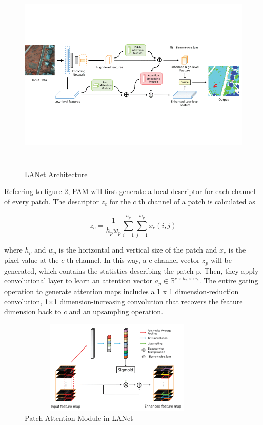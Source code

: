 \FloatBarrier
\begin{figure}[ht]
\includegraphics[width=12.5cm, height=9.5cm]{images/lanet.png}
\centering
\caption{LANet Architecture}
\label{fig:lanet}
\end{figure}

\FloatBarrier

Referring to figure \ref{fig:pam}, PAM will first generate a local descriptor for each channel of every patch. The descriptor $z_c$ for the $c$ th channel of a patch is calculated as

\begin{equation}
    z_c = \frac{1}{h_p w_p} \sum_{i=1}^{h_p} \sum_{j=1}^{w_p} x_c(i,j)
\end{equation}

where $h_p$ and $w_p$ is the horizontal and vertical size of the patch and $x_c$ is the pixel value at the $c$ th channel. In this way, a c-channel vector $z_p$ will be generated, which contains the statistics describing the patch p. Then, they apply convolutional layer to learn an attention vector $a_p \in \mathbb{R}^{c \times h_p \times w_p}$. The entire gating operation to generate attention maps includes a 1 x 1 dimension-reduction convolution, 1×1 dimension-increasing convolution that recovers the feature dimension back to $c$ and an upsampling operation.
\begin{figure}[ht]
\includegraphics[width=9.5cm, height=4.5cm]{images/pam.png}
\centering
\caption{Patch Attention Module in LANet}
\label{fig:pam}
\end{figure}
\FloatBarrier

